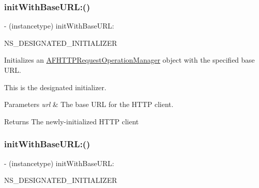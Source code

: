 \subsubsection{\texorpdfstring{init\+With\+Base\+U\+R\+L\+:()}{initWithBaseURL:()}\hspace{0.1cm}{\footnotesize\ttfamily [1/3]}}
{\footnotesize\ttfamily -\/ (instancetype) init\+With\+Base\+U\+R\+L\+: \begin{DoxyParamCaption}\item[{(nullable N\+S\+U\+RL $\ast$)}]{N\+S\+\_\+\+D\+E\+S\+I\+G\+N\+A\+T\+E\+D\+\_\+\+I\+N\+I\+T\+I\+A\+L\+I\+Z\+ER }\end{DoxyParamCaption}}

Initializes an {\ttfamily \mbox{\hyperlink{interface_a_f_h_t_t_p_request_operation_manager}{A\+F\+H\+T\+T\+P\+Request\+Operation\+Manager}}} object with the specified base U\+RL.

This is the designated initializer.


\begin{DoxyParams}{Parameters}
{\em url} & The base U\+RL for the H\+T\+TP client.\\
\hline
\end{DoxyParams}
\begin{DoxyReturn}{Returns}
The newly-\/initialized H\+T\+TP client 
\end{DoxyReturn}
\mbox{\label{interface_a_f_h_t_t_p_request_operation_manager_ac9f2ccf8cfa05afbff8ad4fd2a900190}} 
\subsubsection{\texorpdfstring{init\+With\+Base\+U\+R\+L\+:()}{initWithBaseURL:()}\hspace{0.1cm}{\footnotesize\ttfamily [2/3]}}
{\footnotesize\ttfamily -\/ (instancetype) init\+With\+Base\+U\+R\+L\+: \begin{DoxyParamCaption}\item[{(nullable N\+S\+U\+RL $\ast$)}]{N\+S\+\_\+\+D\+E\+S\+I\+G\+N\+A\+T\+E\+D\+\_\+\+I\+N\+I\+T\+I\+A\+L\+I\+Z\+ER }\end{DoxyParamCaption}}

